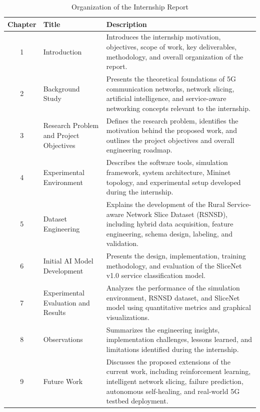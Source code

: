 \documentclass[12pt,a4paper]{report}
\begin{document}
	\begin{table}[H]
		\centering
		\caption{Organization of the Internship Report}
		\label{tab:organization}
		
		\begin{tabular}{|c|p{4.5cm}|p{8cm}|}
			\hline
			
			\textbf{Chapter} &
			\textbf{Title} &
			\textbf{Description}
			\\
			\hline
			
			1 &
			Introduction &
			Introduces the internship motivation, objectives, scope of work, key deliverables, methodology, and overall organization of the report.
			\\
			\hline
			
			2 &
			Background Study &
			Presents the theoretical foundations of 5G communication networks, network slicing, artificial intelligence, and service-aware networking concepts relevant to the internship.
			\\
			\hline
			
			3 &
			Research Problem and Project Objectives &
			Defines the research problem, identifies the motivation behind the proposed work, and outlines the project objectives and overall engineering roadmap.
			\\
			\hline
			
			4 &
			Experimental Environment &
			Describes the software tools, simulation framework, system architecture, Mininet topology, and experimental setup developed during the internship.
			\\
			\hline
			
			5 &
			Dataset Engineering &
			Explains the development of the Rural Service-aware Network Slice Dataset (RSNSD), including hybrid data acquisition, feature engineering, schema design, labeling, and validation.
			\\
			\hline
			
			6 &
			Initial AI Model Development &
			Presents the design, implementation, training methodology, and evaluation of the SliceNet v1.0 service classification model.
			\\
			\hline
			
			7 &
			Experimental Evaluation and Results &
			Analyzes the performance of the simulation environment, RSNSD dataset, and SliceNet model using quantitative metrics and graphical visualizations.
			\\
			\hline
			
			8 &
			Observations &
			Summarizes the engineering insights, implementation challenges, lessons learned, and limitations identified during the internship.
			\\
			\hline
			
			9 &
			Future Work &
			Discusses the proposed extensions of the current work, including reinforcement learning, intelligent network slicing, failure prediction, autonomous self-healing, and real-world 5G testbed deployment.
			\\
			\hline
			
		\end{tabular}
		
	\end{table}
	
\end{document}
